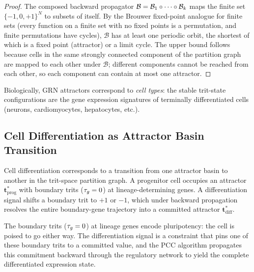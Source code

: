 \begin{proof}
The composed backward propagator $\mathcal{B} = \mathcal{B}_1 \circ \cdots
\circ \mathcal{B}_k$ maps the finite set $\{-1,0,+1\}^N$ to subsets of itself.
By the Brouwer fixed-point analogue for finite sets (every function on
a finite set with no fixed points is a permutation, and finite permutations
have cycles), $\mathcal{B}$ has at least one periodic orbit, the shortest
of which is a fixed point (attractor) or a limit cycle.  The upper bound
follows because cells in the same strongly connected component of the
partition graph are mapped to each other under $\mathcal{B}$; different
components cannot be reached from each other, so each component can
contain at most one attractor.
\end{proof}

Biologically, GRN attractors correspond to \emph{cell types}: the stable
trit-state configurations are the gene expression signatures of terminally
differentiated cells (neurons, cardiomyocytes, hepatocytes, etc.).

\subsection{Cell Differentiation as Attractor Basin Transition}

\begin{proposition}
\label{prop:ch05-differentiation}
Cell differentiation corresponds to a transition from one attractor basin
to another in the trit-space partition graph.  A progenitor cell occupies
an attractor $\mathbf{t}^*_{\mathrm{prog}}$ with boundary trits
($\tau_g = 0$) at lineage-determining genes.  A differentiation signal
shifts a boundary trit to $+1$ or $-1$, which under backward propagation
resolves the entire boundary-gene trajectory into a committed attractor
$\mathbf{t}^*_{\mathrm{diff}}$.
\end{proposition}

The boundary trits ($\tau_g = 0$) at lineage genes encode pluripotency:
the cell is poised to go either way.  The differentiation signal is a
constraint that pins one of these boundary trits to a committed value,
and the PCC algorithm propagates this commitment backward through the
regulatory network to yield the complete differentiated expression state.

